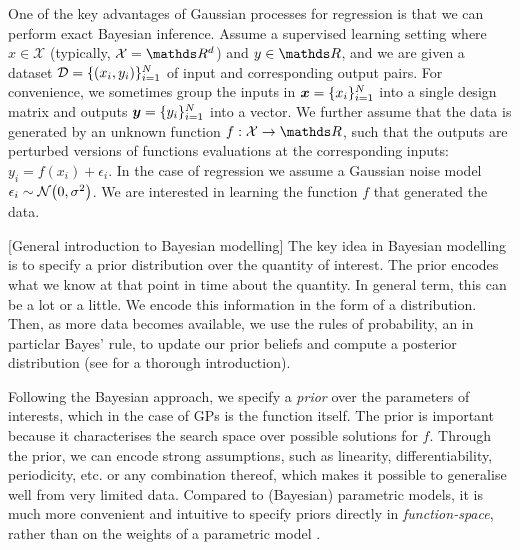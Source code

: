 One of the key advantages of Gaussian processes for regression is that we can perform exact Bayesian inference. %
Assume a supervised learning setting where $x \in \mathcal{X}$ (typically, $\mathcal{X} = \Reals^d$) and $y \in \Reals$, and we are given a dataset $\mathcal{D} = \{(x_i, y_i)\}_{i=1}^N$ of input and corresponding output pairs. For convenience, we sometimes group the inputs in $\bm{x} = \{x_i\}_{i=1}^N$ into a single design matrix and outputs $\bm{y} = \{y_i\}_{i=1}^N$ into a vector. We further assume that the data is generated by an unknown function $f: \mathcal{X} \rightarrow \Reals$, such that the outputs are perturbed versions of functions evaluations at the corresponding inputs: $y_i = f(x_i) + \epsilon_i$. In the case of regression we assume a Gaussian noise model $\epsilon_i \sim \NormDist{0, \sigma^2}$. We are interested in learning the function $f$ that generated the data. %

[General introduction to Bayesian modelling]
The key idea in Bayesian modelling is to specify a prior distribution over the quantity of interest. The prior encodes what we know at that point in time about the quantity. In general term, this can be a lot or a little. We encode this information in the form of a distribution. Then, as more data becomes available, we use the rules of probability, an in particlar Bayes' rule, to update our prior beliefs and compute a posterior distribution (see \citet{mackay2003information, bisschop} for a thorough introduction).

Following the Bayesian approach, we specify a \emph{prior} over the parameters of interests, which in the case of GPs is the function itself. The prior is important because it characterises the search space over possible solutions for $f$. Through the prior, we can encode strong assumptions, such as linearity, differentiability, periodicity, etc. or any combination thereof, which makes it possible to generalise well from very limited data. Compared to (Bayesian) parametric models, it is much more convenient and intuitive to specify priors directly in \emph{function-space}, rather than on the weights of a parametric model \citep{rasmussen2006}. 

